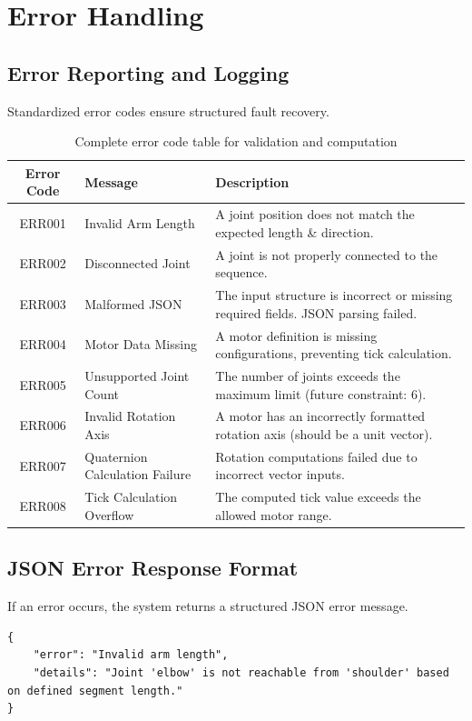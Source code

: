 \documentclass{article}
\begin{document}
\section{Error Handling}
\subsection{Error Reporting and Logging}
Standardized error codes ensure structured fault recovery.

\begin{table}[h]
\centering
\begin{tabular}{|c|l|p{8cm}|}
\hline
\textbf{Error Code} & \textbf{Message} & \textbf{Description} \\
\hline
ERR001 & Invalid Arm Length & A joint position does not match the expected length \& direction. \\
\hline
ERR002 & Disconnected Joint & A joint is not properly connected to the sequence. \\
\hline
ERR003 & Malformed JSON & The input structure is incorrect or missing required fields. JSON parsing failed. \\
\hline
ERR004 & Motor Data Missing & A motor definition is missing configurations, preventing tick calculation. \\
\hline
ERR005 & Unsupported Joint Count & The number of joints exceeds the maximum limit (future constraint: 6). \\
\hline
ERR006 & Invalid Rotation Axis & A motor has an incorrectly formatted rotation axis (should be a unit vector). \\
\hline
ERR007 & Quaternion Calculation Failure & Rotation computations failed due to incorrect vector inputs. \\
\hline
ERR008 & Tick Calculation Overflow & The computed tick value exceeds the allowed motor range. \\
\hline
\end{tabular}
\caption{Complete error code table for validation and computation}
\end{table}

\subsection{JSON Error Response Format}
If an error occurs, the system returns a structured JSON error message.

\begin{verbatim}
{
    "error": "Invalid arm length",
    "details": "Joint 'elbow' is not reachable from 'shoulder' based on defined segment length."
}
\end{verbatim}
\end{document}
